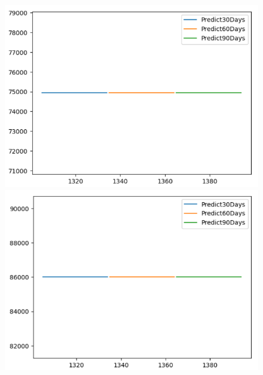 \begin{figure}[H]
\begin{minipage}{0.15\textwidth}
    \includegraphics[width=1\textwidth]{resources/chapter-5/newdata1/predicted/VCB_ARIMA_8-2_30days.png}
    \end{minipage}
    \hfill
        \begin{minipage}{0.15\textwidth}
    \centering
    \includegraphics[width=1\textwidth]{resources/chapter-5/newdata1/predicted/VCB_ARIMA_9-1_30days.png}
    \end{minipage}
    \hfill
    \begin{minipage}{0.15\textwidth}
    \centering

\end{minipage}
\end{figure}
